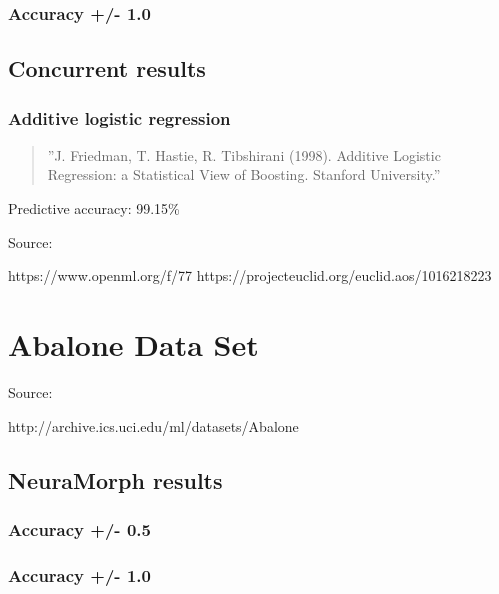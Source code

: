 \documentclass[8pt, a4paper]{article}
\begin{document}


\subsubsection{Accuracy +/- 1.0}



\subsection{Concurrent results}

\subsubsection{Additive logistic regression}

\begin{quote}
''J. Friedman, T. Hastie, R. Tibshirani (1998). Additive Logistic Regression: a Statistical View of Boosting. Stanford University.''
\end{quote}

Predictive accuracy: 99.15\%

Source:

https://www.openml.org/f/77
https://projecteuclid.org/euclid.aos/1016218223




\newpage
\section{Abalone Data Set}

Source: 

http://archive.ics.uci.edu/ml/datasets/Abalone

\subsection{NeuraMorph results}

\subsubsection{Accuracy +/- 0.5}



\subsubsection{Accuracy +/- 1.0}


\end{document}

